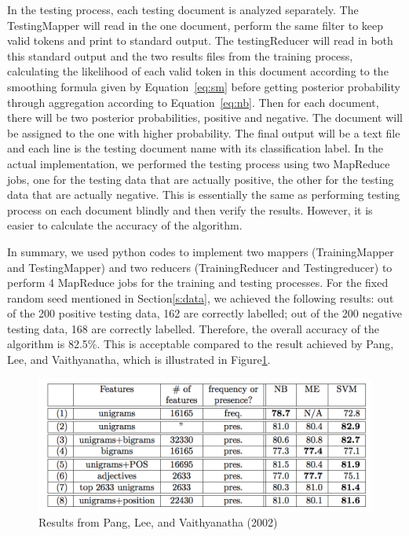  In the testing process, each testing document is analyzed separately. The 
 TestingMapper will read in the one document, perform the same filter to 
 keep valid tokens and print to standard output. The testingReducer will read 
 in both this standard output and the two results files from the training 
 process, calculating the likelihood of each valid token in this document 
 according to the smoothing formula given by Equation~\ref{eq:sm} before 
 getting posterior probability through aggregation according to 
 Equation~\ref{eq:nb}. Then for each document, there will be two posterior 
 probabilities, positive and negative. The document will be assigned to the 
 one with higher probability. The final output will be a text file and each line is 
 the testing document name with its classification label. In the actual 
 implementation, we performed the testing process using two MapReduce 
 jobs, one for the testing data that are actually positive, the other for the 
 testing data that are actually negative. This is essentially the same as 
 performing testing process on each document blindly and then verify the 
 results. However, it is easier to calculate the accuracy of the algorithm. 
 
 In summary, we used python codes to implement two mappers 
 (TrainingMapper and TestingMapper) and two reducers (TrainingReducer 
 and Testingreducer) to perform 4 MapReduce jobs for the training and 
 testing processes. For the fixed random seed mentioned in 
 Section\ref{s:data}, we achieved the following results: out of the 200 
 positive testing data, 162 are correctly labelled; out of the 200 negative 
 testing data, 168 are correctly labelled. Therefore, the
 overall accuracy of the algorithm is 82.5\%. This is acceptable 
 compared to the result achieved by Pang, Lee, and Vaithyanatha, which is 
 illustrated in Figure\ref{f:pang-result}. 
% 

\begin{figure}[!ht]
	\centering\includegraphics[width=\columnwidth]{images/pang-result.png}
	\caption{Results from Pang, Lee, and Vaithyanatha (2002)
	~\cite{hid-sp18-405-sentiment-pang2002thumbs}}\label{f:pang-result}
\end{figure}


